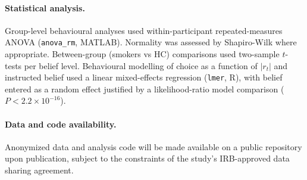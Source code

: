 \documentclass[11pt]{article}
\begin{document}
\paragraph{Statistical analysis.} Group-level behavioural analyses used within-participant repeated-measures ANOVA (\texttt{anova\_rm}, MATLAB). Normality was assessed by Shapiro-Wilk where appropriate. Between-group (smokers vs HC) comparisons used two-sample $t$-tests per belief level. Behavioural modelling of choice as a function of $|r_t|$ and instructed belief used a linear mixed-effects regression (\texttt{lmer}, R), with belief entered as a random effect justified by a likelihood-ratio model comparison ($P<2.2\times10^{-16}$).

\paragraph{Data and code availability.} Anonymized data and analysis code will be made available on a public repository upon publication, subject to the constraints of the study's IRB-approved data sharing agreement.



\end{document}

